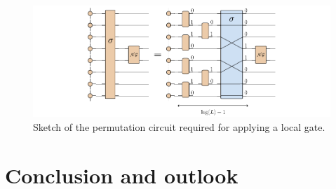 \documentclass[a4paper, twocolumn, superscriptaddress, longbibliography]{revtex4-2}
\begin{document}
	\begin{figure}[t]
		\centering
		\includegraphics[width=1.\textwidth]{Figs/Sketch/Sketch_permutation.pdf}
		\caption{Sketch of the permutation circuit required for applying a local gate.}
		\label{fig:permutation}
	\end{figure}


	\section{Conclusion and outlook}


	

      \begin{appendices}
	\end{appendices}
\end{document}
